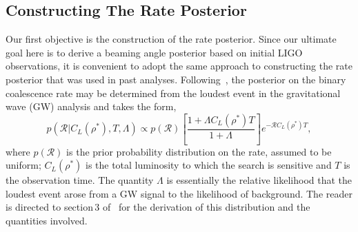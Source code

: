 \documentclass[twocolumn,nofootinbib]{revtex4-1}
\newcommand{\cbcrate}{{{\mathcal R}}}
\newcommand{\rhostar}{{\rho^*}}
\def\gw#1{gravitational wave#1 (GW#1)\gdef\gw{GW}}
\begin{document}
\subsection{Constructing The Rate Posterior}
Our first objective is the construction of the rate posterior.  Since our
ultimate goal here is to derive a beaming angle posterior based on initial LIGO
observations, it is convenient to adopt the same approach to constructing the
rate posterior that was used in past analyses.
Following~\cite{Biswas09,BradyFairhurst08}, the posterior on the binary
coalescence rate may be determined from the loudest event in the \gw{} analysis
and takes the form,
%
%
%
%
%
\begin{equation}\label{eq:loudestEventPosterior}
p(\cbcrate | C_L({\rhostar}), T, \Lambda) \propto p(\cbcrate) \left[ \frac{1+\Lambda
C_L(\rhostar) T}{1+\Lambda}\right] e^{-\cbcrate C_L(\rhostar) T},
\end{equation}
%
where $p(\cbcrate)$ is the prior probability distribution on the rate, assumed
to be uniform; $C_L(\rhostar)$ is the total luminosity to which the search is
sensitive and $T$ is the observation time.  The quantity $\Lambda$ is
essentially the relative likelihood that the loudest event arose from a \gw{}
signal to the likelihood of background.  The reader is directed to section\,3
of~\cite{BradyFairhurst08} for the derivation of this distribution and the
quantities involved.
\end{document}

